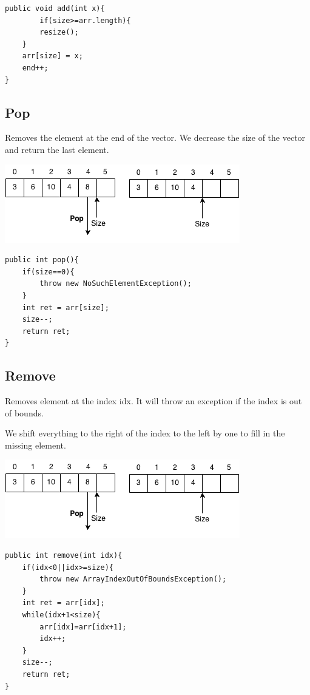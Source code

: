 \documentclass[11pt,oneside]{book}
\makeatletter
\def\maxwidth#1{\ifdim\Gin@nat@width>#1 #1\else\Gin@nat@width\fi}
\makeatother
\begin{document}
\begin{lstlisting}
public void add(int x){
        if(size>=arr.length){
        resize();
    }
    arr[size] = x;
    end++;
}
\end{lstlisting}

\subsection{Pop}

Removes the element at the end of the vector. We decrease the size of the vector and return the last element.

\vspace{5px}\includegraphics[width=\maxwidth{\textwidth}]{vector4.png}

\begin{lstlisting}
public int pop(){
    if(size==0){
        throw new NoSuchElementException();
    }
    int ret = arr[size];
    size--;
    return ret;
}
\end{lstlisting}

\subsection{Remove}

Removes element at the index idx. It will throw an exception if the index is out of bounds.

We shift everything to the right of the index to the left by one to fill in the missing element.

\vspace{5px}\includegraphics[width=\maxwidth{\textwidth}]{vector4.png}

\begin{lstlisting}
public int remove(int idx){
    if(idx<0||idx>=size){
        throw new ArrayIndexOutOfBoundsException();
    }
    int ret = arr[idx];
    while(idx+1<size){
        arr[idx]=arr[idx+1];
        idx++;
    }
    size--;
    return ret;
}
\end{lstlisting}
\end{document}
